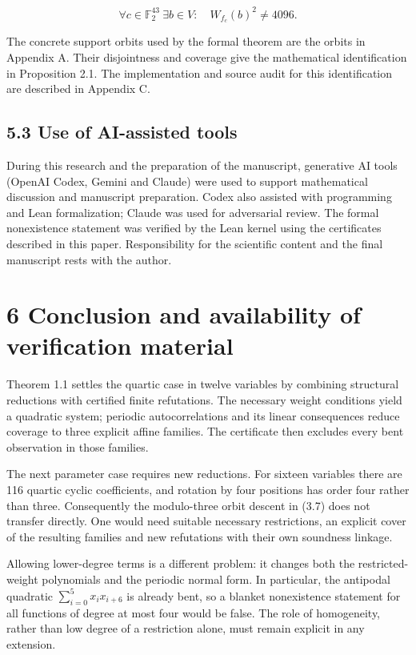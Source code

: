 \documentclass[pdflatex,sn-mathphys-num]{sn-jnl}
\begin{document}
\[
\forall c\in\mathbb F_2^{43}\ \exists b\in V:\quad W_{f_c}(b)^2\ne4096. \tag{5.1}
\]

The concrete support orbits used by the formal theorem are the orbits in Appendix A. Their disjointness and coverage give the mathematical identification in Proposition 2.1. The implementation and source audit for this identification are described in Appendix C.

\subsection*{5.3 Use of AI-assisted tools}

During this research and the preparation of the manuscript, generative AI tools (OpenAI Codex, Gemini and Claude) were used to support mathematical discussion and manuscript preparation. Codex also assisted with programming and Lean formalization; Claude was used for adversarial review. The formal nonexistence statement was verified by the Lean kernel using the certificates described in this paper. Responsibility for the scientific content and the final manuscript rests with the author.

\section*{6 Conclusion and availability of verification material}

Theorem 1.1 settles the quartic case in twelve variables by combining structural reductions with certified finite refutations. The necessary weight conditions yield a quadratic system; periodic autocorrelations and its linear consequences reduce coverage to three explicit affine families. The certificate then excludes every bent observation in those families.

The next parameter case requires new reductions. For sixteen variables there are 116 quartic cyclic coefficients, and rotation by four positions has order four rather than three. Consequently the modulo-three orbit descent in (3.7) does not transfer directly. One would need suitable necessary restrictions, an explicit cover of the resulting families and new refutations with their own soundness linkage.

Allowing lower-degree terms is a different problem: it changes both the restricted-weight polynomials and the periodic normal form. In particular, the antipodal quadratic $\sum_{i=0}^{5}x_ix_{i+6}$ is already bent, so a blanket nonexistence statement for all functions of degree at most four would be false. The role of homogeneity, rather than low degree of a restriction alone, must remain explicit in any extension.
\end{document}
